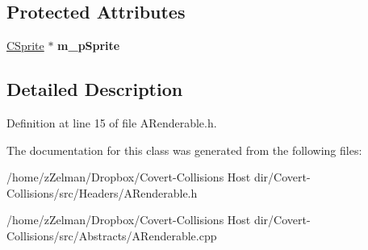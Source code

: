 \subsection*{Protected Attributes}
\begin{DoxyCompactItemize}
\item 
\hypertarget{classARenderable_a6030df923c81b400e94ff1f6a9df41f8}{\hyperlink{classCSprite}{C\-Sprite} $\ast$ {\bfseries m\-\_\-p\-Sprite}}\label{classARenderable_a6030df923c81b400e94ff1f6a9df41f8}

\end{DoxyCompactItemize}


\subsection{Detailed Description}


Definition at line 15 of file A\-Renderable.\-h.



The documentation for this class was generated from the following files\-:\begin{DoxyCompactItemize}
\item 
/home/z\-Zelman/\-Dropbox/\-Covert-\/\-Collisions Host dir/\-Covert-\/\-Collisions/src/\-Headers/A\-Renderable.\-h\item 
/home/z\-Zelman/\-Dropbox/\-Covert-\/\-Collisions Host dir/\-Covert-\/\-Collisions/src/\-Abstracts/A\-Renderable.\-cpp\end{DoxyCompactItemize}
